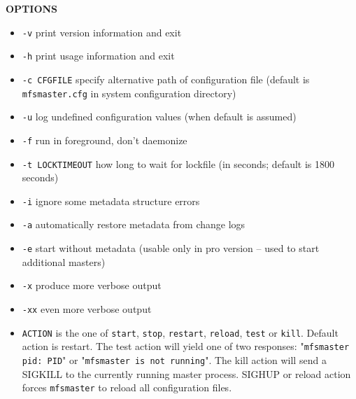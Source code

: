 \documentclass[a4paper,11pt,english]{report}
\def\code#1{\texttt{#1}}
\begin{document}
				\textbf{OPTIONS}
				\begin{itemize}
 					\item \code{-v}     print version information and exit
					\item \code{-h}     print usage information and exit
					\item \code{-c CFGFILE}
						specify  alternative path of configuration file (default is \code{mfsmaster.cfg} in system configuration directory)
					\item \code{-u}     log undefined configuration values (when default is assumed)
					\item \code{-f}     run in foreground, don't daemonize
					\item \code{-t LOCKTIMEOUT}
						how long to wait for lockfile (in seconds; default is 1800 seconds)
					\item \code{-i}     ignore some metadata structure errors
					\item \code{-a}     automatically restore metadata from change logs
					\item \code{-e}     start without metadata (usable only in pro version -- used to start additional masters)
					\item \code{-x}     produce more verbose output
					\item \code{-xx}    even more verbose output
						
					\item \code{ACTION} is  the  one  of  \code{start},  \code{stop},  \code{restart},  \code{reload}, \code{test} or \code{kill}.
						Default action is restart. The test action will yield one of two
						responses:  "\code{mfsmaster  pid: PID}" or "\code{mfsmaster is not running}".
						The kill action will send a SIGKILL  to  the  currently  running
						master  process.  SIGHUP  or  reload  action forces \code{mfsmaster} to
						reload all configuration files.
				\end{itemize}
				
\end{document}
